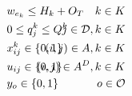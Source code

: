 \begin{alignat}{3}
    \label{mod:c31}        & w_{e_k} \leq H_k + O_T                                                                                                                                                                                                                                                                           & \hspace{-00mm}  k \in K \hspace{0mm}                                                             \\
    \label{mod:c32}        & 0 \leq q^k_j \leq Q^k                                                                                                                                                                                                                                                                            & \hspace{-20mm}  j \in \mathcal{D}, k \in K                                                       \\
    \label{mod:c33}        & x^k_{ij} \in \{0,1\}                                                                                                                                                                                                                                                                             & \hspace{-20mm}  (i,j) \in A , k \in K  \hspace{0mm}                                              \\
    \label{mod:c34}        & u_{ij} \in \{0,1\}                                                                                                                                                                                                                                                                               & \hspace{-20mm}  (i,j) \in A^D , k \in K  \hspace{0mm}                                            \\
    \label{mod:c36}        & y_o \in \{0,1\}                                                                                                                                                                                                                                                                                  & \hspace{-20mm}  o \in \mathcal{O}                                                                \\

\end{alignat}
